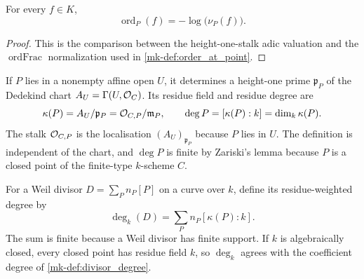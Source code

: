 \begin{lemma}
  \label{mk-lem:adelic_order_eq_neg_log_pointValuation}
  \leanok


  For every \(f\in K\),
  \[
    \operatorname{ord}_P(f)=-\log\bigl(\nu_P(f)\bigr).
  \]
\end{lemma}
\begin{proof}
  \leanok
  This is the comparison between the height-one-stalk adic valuation and the
  \(\operatorname{ordFrac}\) normalization used in
  \ref{mk-def:order_at_point}.
\end{proof}

\begin{definition}
  \label{mk-def:adelic_residue_degree}

  If \(P\) lies in a nonempty affine open \(U\), it determines a height-one
  prime \(\mathfrak p_P\) of the Dedekind chart
  \(A_U=\Gamma(U,\mathcal{O}_{C})\).  Its residue field and residue degree are
  \[
    \kappa(P)=A_U/\mathfrak p_P
      =\mathcal{O}_{C,P}/\mathfrak m_P,
    \qquad
    \deg P=[\kappa(P):k]=\dim_k\kappa(P).
  \]
  The stalk \(\mathcal{O}_{C, P}\) is the localisation \((A_U)_{\mathfrak p_P}\)
  because \(P\) lies in \(U\).  The definition is independent of the chart,
  and \(\deg P\) is finite by Zariski's lemma because \(P\) is a closed point
  of the finite-type \(k\)-scheme \(C\).
\end{definition}

\begin{definition}
  \label{mk-def:adelic_divisor_degree}

  For a Weil divisor \(D=\sum_P n_P[P]\) on a curve over \(k\), define its
  residue-weighted degree by
  \[
    \deg_k(D)=\sum_P n_P[\kappa(P):k].
  \]
  The sum is finite because a Weil divisor has finite support.  If \(k\) is
  algebraically closed, every closed point has residue field \(k\), so
  \(\deg_k\) agrees with the coefficient degree of
  \ref{mk-def:divisor_degree}.
\end{definition}

